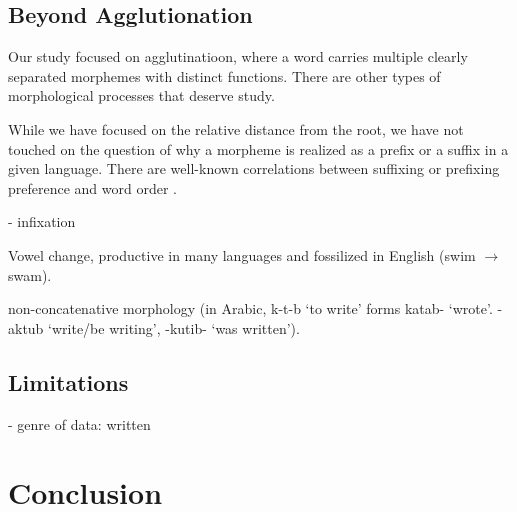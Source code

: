 \documentclass[11pt,letterpaper]{article}
\begin{document}


\subsection{Beyond Agglutionation}

Our study focused on agglutinatioon, where a word carries multiple clearly separated morphemes with distinct functions.
There are other types of morphological processes that deserve study.

While we have focused on the relative distance from the root, we have not touched on the question of why a morpheme is realized as a prefix or a suffix in a given language.
There are well-known correlations between suffixing or prefixing preference and word order \citep{greenberg1963universals}.

- infixation

Vowel change, productive in many languages and fossilized in English (swim $\rightarrow$ swam).

non-concatenative morphology (in Arabic, k-t-b `to write' forms katab- `wrote'. -aktub `write/be writing', -kutib- `was written').

\subsection{Limitations}

- genre of data: written



\section{Conclusion}



\end{document}
